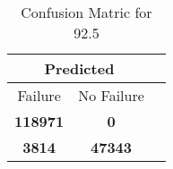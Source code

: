 \begin{table}[] 
\caption{Confusion Matric for 92.5} 
\label{Table: Prediction Accuracy-DMD92.5OnlySunEKF-combinationReflectionperfectNoFailurePrediction-Reflection} 
\centering 
\begin{tabular} 
 {@{}ccc@{}} 
\toprule 
\multicolumn{2}{c}{\textbf{Predicted}}
 \\ \midrule 
\multicolumn{1}{|c|}{Failure} & 
\multicolumn{1}{c|}{No Failure}
 \\ \midrule 
\multicolumn{1}{|c|}{\color{green}\textbf{118971}} & 
\multicolumn{1}{c|}{\color{red}\textbf{0}}
 \\ \midrule 
\multicolumn{1}{|c|}{\color{red}\textbf{3814}} & 
\multicolumn{1}{c|}{\color{green}\textbf{47343}}
 \\ \bottomrule 
\end{tabular} 
\end{table} 
